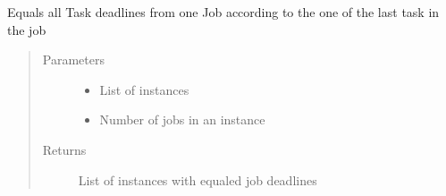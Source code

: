 \documentclass[letterpaper,10pt,english]{sphinxmanual}
\begin{document}
\begin{fulllineitems}
\begin{fulllineitems}
\label{\detokenize{data_generator:data_generator.sp_factory.SPFactory.set_deadlines_to_max_deadline_per_job}}
\sphinxAtStartPar
Equals all Task deadlines from one Job according to the one of the last task in the job
\begin{quote}\begin{description}
\item[{Parameters}] \leavevmode\begin{itemize}
\item {} 
\sphinxAtStartPar
{} \textendash{} List of instances

\item {} 
\sphinxAtStartPar
{} \textendash{} Number of jobs in an instance

\end{itemize}

\item[{Returns}] \leavevmode
\sphinxAtStartPar
List of instances with equaled job deadlines

\end{description}\end{quote}

\end{fulllineitems}


\begin{fulllineitems}
\label{\detokenize{data_generator:data_generator.sp_factory.SPFactory.compute_and_set_hashes}}
\end{fulllineitems}


\end{fulllineitems}
\end{document}
